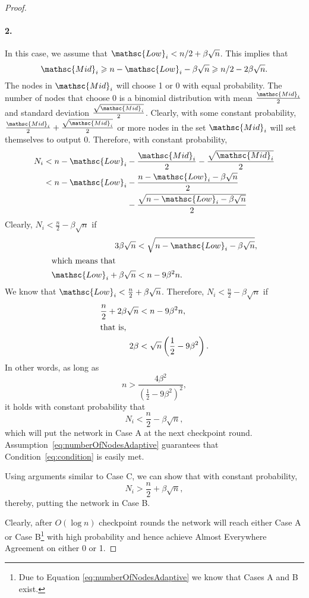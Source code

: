 \documentclass[leqno,11pt]{article}
\renewcommand{\ge}{\geqslant}
\renewcommand{\le}{\leqslant}
\newcommand{\lo}{{\mathsc{Low}}}
\renewcommand{\mid}{{\mathsc{Mid}}}
\begin{document}
{\begin{proof}
\begin{description}
\paragraph{2.} In this case, we assume that $\lo_i < n/2 + \beta \sqrt{n}$. This implies that 
 \begin{equation*}\mid_i \ge n - \lo_i - \beta \sqrt{n} \ge n/2 - 2\beta \sqrt{n}.\end{equation*} The nodes in $\mid_i$ will choose 1 or 0 with equal probability. The number of nodes that choose 0 is a binomial distribution with mean $\frac{\mid_i}{2}$ and standard deviation $ \frac{\sqrt{\mid_i}}{2}$. Clearly, with some constant probability, $\frac{\mid_i}{2} + \frac{\sqrt{\mid_i}}{2}$ or more nodes in the set $\mid_i$ will set themselves to output 0. Therefore, with constant probability,  
\begin{align*}
	N_i <  n - \lo_i &- \frac{\mid_i}{2} - \frac{\sqrt{\mid_i}}{2} \\
      < n - \lo_i &- \frac{n - \lo_i - \beta \sqrt{n}}{2} \\
                  &- \frac{\sqrt{n - \lo_i - \beta \sqrt{n}}}{2} 
\end{align*}
Clearly, $N_i < \frac{n}{2} - \beta \sqrt{n}$ if 
\begin{align*}
3 \beta \sqrt{n} &< \sqrt{n - \lo_i - \beta \sqrt{n}},\\
\intertext{which means that}
\lo_i + \beta \sqrt{n} &< n - 9 \beta^2 n.
\end{align*}
We know that $\lo_i < \frac{n}{2} + \beta \sqrt{n}$. Therefore, $N_i < \frac{n}{2} - \beta \sqrt{n}$ if 
\begin{align*}
\frac{n}{2} + 2 \beta \sqrt{n} &< n - 9 \beta^2 n, \\
\intertext{that is,}
2 \beta &< \sqrt{n} \left(\frac{1}{2} - 9 \beta^2 \right ).
\end{align*}
In other words, as long as 
\begin{equation}
n > \frac{4 \beta^2}{\left(\frac{1}{2} - 9 \beta^2 \right )^2},
\label{eq:condition}
\end{equation}
it holds with constant probability that
\begin{equation*}N_i< \frac{n}{2} - \beta \sqrt{n},\end{equation*}
which will put
the network in Case A at the next checkpoint round. Assumption~\eqref{eq:numberOfNodesAdaptive} guarantees that Condition~\eqref{eq:condition}
is easily met. 
\item[Case D ($n/2  < N_{i-1} \le n/2 +\beta \sqrt{n}$):] Using arguments
similar to Case C, we can show that with constant probability, 
\begin{equation*}N_i > \frac{n}{2} + \beta \sqrt{n},\end{equation*}
thereby, putting the network in Case B. 
\end{description}
Clearly, after $O(\log n)$ checkpoint rounds the network
will reach either Case A or Case B\footnote{Due to Equation
\eqref{eq:numberOfNodesAdaptive} we know that Cases A and B exist.} with high probability and hence achieve Almost Everywhere
Agreement on either 0 or 1.


\end{proof}}
\end{document}
